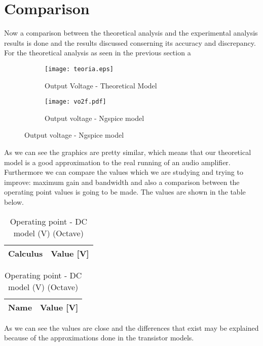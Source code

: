 \section{Comparison}
\label{section:comparison}

\par Now a comparison between the theoretical analysis and the experimental analysis results is done and the results discussed conserning its accuracy and discrepancy. For the theoretical analysis as seen in the previous section a 
 

\begin{figure}[H]
\centering
\begin{subfigure}{.5\textwidth}
  \centering
  \texttt{[image: teoria.eps]}
  \caption{Output Voltage - Theoretical Model}
  \label{fig:sim4}
\end{subfigure}
\begin{subfigure}{.5\textwidth}
  \centering
  \texttt{[image: vo2f.pdf]}
  \caption{Output voltage - Ngspice model}
  \label{fig:sim5}
\end{subfigure}
\end{figure}

\par As we can see the graphics are pretty similar, which means that our theoretical model is a good approximation to the real running of an audio amplifier. Furthermore we can compare the values which we are studying and trying to improve: maximum gain and bandwidth and also a comparison between the operating point values is going to be made. The values are shown in the table below.

\begin{table}[H]
\parbox{.45\linewidth}{
  \centering
  \begin{tabular}{|l|r|}
    \hline    
    {\bf Calculus} & {\bf Value [V]} \\ \hline
    
  \end{tabular}
  \caption{Operating point - DC model (V) (Ngspice)}} 
\parbox{.45\linewidth}{
 \centering
  \begin{tabular}{|l|r|}
    \hline    
    {\bf Name} & {\bf Value [V]} \\ \hline
    
  \end{tabular}
  \caption{Operating point - DC model (V) (Octave)}}
\end{table}

\par As we can see the values are close and the differences that exist may be explained because of the approximations done in the transistor models.
\newpage

